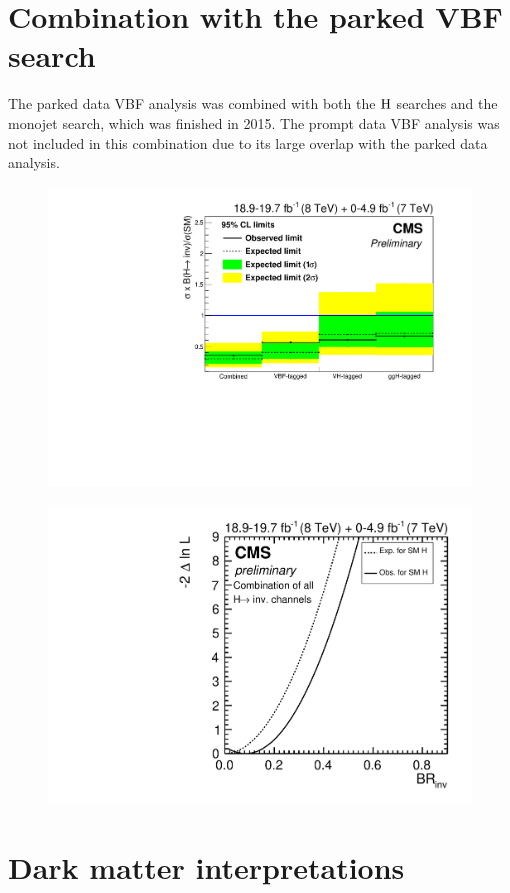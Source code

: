 \section{Combination with the parked VBF search}
\label{sec:combparked}
The parked data \ac{VBF} analysis was combined with both the \PZ$\rm{H}$ searches and the monojet search, which was finished in 2015. The prompt data \ac{VBF} analysis was not included in this combination due to its large overlap with the parked data analysis.



\begin{figure}
  \includegraphics[width=\largefigwidth]{plots/comb/HIG-15-012-figs/channellimit.pdf}
  \caption{}%
  \label{fig:parkedcombchannel}
\end{figure}

\begin{figure}
  \includegraphics[width=\largefigwidth]{plots/comb/HIG-15-012-figs/combscan.pdf}
  \caption{}%
  \label{fig:parkedcombscan}
\end{figure}



\section{Dark matter interpretations}
\label{sec:dminterp}
